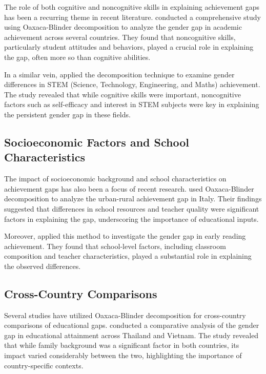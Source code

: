 \documentclass[12pt,a4paper,onecolumn]{article}
\numberwithin{equation}{section}
\begin{document}
The role of both cognitive and noncognitive skills in explaining achievement gaps has been a recurring theme in recent literature. \parencite{fortin2015} conducted a comprehensive study using Oaxaca-Blinder decomposition to analyze the gender gap in academic achievement across several countries. They found that noncognitive skills, particularly student attitudes and behaviors, played a crucial role in explaining the gap, often more so than cognitive abilities.

In a similar vein, \parencite{nguyen2020} applied the decomposition technique to examine gender differences in STEM (Science, Technology, Engineering, and Maths) achievement. The study revealed that while cognitive skills were important, noncognitive factors such as self-efficacy and interest in STEM subjects were key in explaining the persistent gender gap in these fields.

\subsection{Socioeconomic Factors and School Characteristics}

The impact of socioeconomic background and school characteristics on achievement gaps has also been a focus of recent research. \parencite{agasisti2021} used Oaxaca-Blinder decomposition to analyze the urban-rural achievement gap in Italy. Their findings suggested that differences in school resources and teacher quality were significant factors in explaining the gap, underscoring the importance of educational inputs.

Moreover, \parencite{cimpian2016} applied this method to investigate the gender gap in early reading achievement. They found that school-level factors, including classroom composition and teacher characteristics, played a substantial role in explaining the observed differences.

\subsection{Cross-Country Comparisons}

Several studies have utilized Oaxaca-Blinder decomposition for cross-country comparisons of educational gaps. \parencite{lounkaew2013} conducted a comparative analysis of the gender gap in educational attainment across Thailand and Vietnam. The study revealed that while family background was a significant factor in both countries, its impact varied considerably between the two, highlighting the importance of country-specific contexts.
\end{document}
